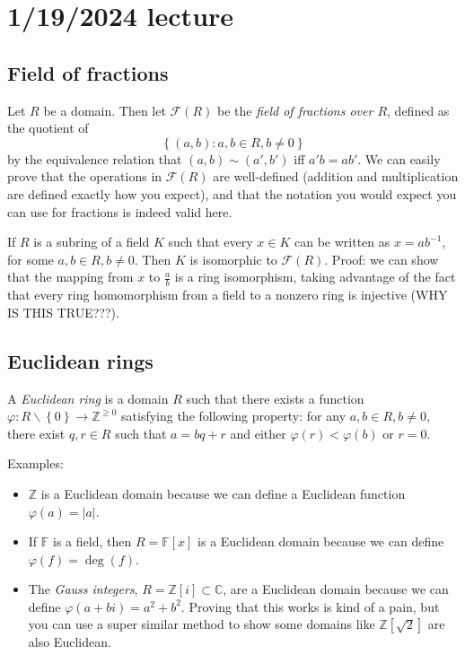 \documentclass[12pt]{article}
\begin{document}
\section{1/19/2024 lecture}
\subsection{Field of fractions}
Let $R$ be a domain. Then let $\mathcal{F}(R)$ be the \textit{field of fractions over $R$}, defined as the quotient of
\[ \left\{ (a,b): a,b \in R, b \neq 0 \right\} \]
by the equivalence relation that $(a,b) \sim (a',b')$ iff $a'b=ab'$. We can easily prove that the operations in $\mathcal{F}(R)$ are well-defined (addition and multiplication are defined exactly how you expect), and that the notation you would expect you can use for fractions is indeed valid here.
\par
If $R$ is a subring of a field $K$ such that every $x \in K$ can be written as $x = ab^{-1}$, for some $a,b \in R, b \neq 0$. Then $K$ is isomorphic to $\mathcal{F}(R)$. Proof: we can show that the mapping from $x$ to $\frac{a}{b}$ is a ring isomorphism, taking advantage of the fact that every ring homomorphism from a field to a nonzero ring is injective (WHY IS THIS TRUE???).

\subsection{Euclidean rings}
A \textit{Euclidean ring} is a domain $R$ such that there exists a function $\varphi : R \backslash \left\{ 0 \right\} \rightarrow \mathbb{Z}^{\geq 0}$ satisfying the following property: for any $a,b \in R, b\neq 0$, there exist $q,r \in R$ such that $a=bq+r$ and either $\varphi(r) < \varphi(b)$ or $r=0$.
\par
Examples:
\begin{itemize}
    \item $\mathbb{Z}$ is a Euclidean domain because we can define a Euclidean function $\varphi(a) = |a|$.
    \item If $\mathbb{F}$ is a field, then $R= \mathbb{F}[x]$ is a Euclidean domain because we can define $\varphi(f) = \operatorname{deg}(f)$.
    \item The \textit{Gauss integers}, $R = \mathbb{Z}[i] \subset \mathbb{C}$, are a Euclidean domain because we can define $\varphi(a+bi)=a^2+b^2$. Proving that this works is kind of a pain, but you can use a super similar method to show some domains like $\mathbb{Z}[\sqrt{2}]$ are also Euclidean.
\end{itemize}
\end{document}
